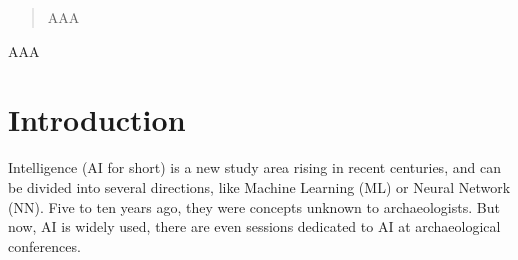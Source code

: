\documentclass[journal]{IEEEtran}
\begin{document}
	
	
	
	
	
	
	
	
	
	
	\maketitle
	
	\begin{abstract}
		AAA
	\end{abstract}
	
	\begin{IEEEkeywords}
		AAA
	\end{IEEEkeywords}
	
	
	
	
	
	
	\IEEEpeerreviewmaketitle
	
	
	
	\section{Introduction}
	 Intelligence (AI for short) is a new study area rising in recent centuries, and can be divided into several directions, like Machine Learning (ML) or Neural Network (NN). Five to ten years ago, they were concepts unknown to archaeologists. But now, AI is widely used, there are even sessions dedicated to AI at archaeological conferences.\cite{heritage4010008}
	
\end{document}
